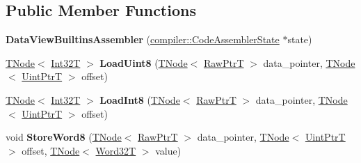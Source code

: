\subsection*{Public Member Functions}
\begin{DoxyCompactItemize}
\item 
\mbox{\label{classv8_1_1internal_1_1DataViewBuiltinsAssembler_a2ac89586bf597c858a300190d733b458}} 
{\bfseries Data\+View\+Builtins\+Assembler} (\mbox{\hyperlink{classv8_1_1internal_1_1compiler_1_1CodeAssemblerState}{compiler\+::\+Code\+Assembler\+State}} $\ast$state)
\item 
\mbox{\label{classv8_1_1internal_1_1DataViewBuiltinsAssembler_a9f5eb65a61b2cbe8985f022b7ca23966}} 
\mbox{\hyperlink{classv8_1_1internal_1_1compiler_1_1TNode}{T\+Node}}$<$ \mbox{\hyperlink{structv8_1_1internal_1_1Int32T}{Int32T}} $>$ {\bfseries Load\+Uint8} (\mbox{\hyperlink{classv8_1_1internal_1_1compiler_1_1TNode}{T\+Node}}$<$ \mbox{\hyperlink{structv8_1_1internal_1_1RawPtrT}{Raw\+PtrT}} $>$ data\+\_\+pointer, \mbox{\hyperlink{classv8_1_1internal_1_1compiler_1_1TNode}{T\+Node}}$<$ \mbox{\hyperlink{structv8_1_1internal_1_1UintPtrT}{Uint\+PtrT}} $>$ offset)
\item 
\mbox{\label{classv8_1_1internal_1_1DataViewBuiltinsAssembler_aa5d813eb0bf639de531bba19013b8c51}} 
\mbox{\hyperlink{classv8_1_1internal_1_1compiler_1_1TNode}{T\+Node}}$<$ \mbox{\hyperlink{structv8_1_1internal_1_1Int32T}{Int32T}} $>$ {\bfseries Load\+Int8} (\mbox{\hyperlink{classv8_1_1internal_1_1compiler_1_1TNode}{T\+Node}}$<$ \mbox{\hyperlink{structv8_1_1internal_1_1RawPtrT}{Raw\+PtrT}} $>$ data\+\_\+pointer, \mbox{\hyperlink{classv8_1_1internal_1_1compiler_1_1TNode}{T\+Node}}$<$ \mbox{\hyperlink{structv8_1_1internal_1_1UintPtrT}{Uint\+PtrT}} $>$ offset)
\item 
\mbox{\label{classv8_1_1internal_1_1DataViewBuiltinsAssembler_aaa49121464674eaa54b5bcdb797e6064}} 
void {\bfseries Store\+Word8} (\mbox{\hyperlink{classv8_1_1internal_1_1compiler_1_1TNode}{T\+Node}}$<$ \mbox{\hyperlink{structv8_1_1internal_1_1RawPtrT}{Raw\+PtrT}} $>$ data\+\_\+pointer, \mbox{\hyperlink{classv8_1_1internal_1_1compiler_1_1TNode}{T\+Node}}$<$ \mbox{\hyperlink{structv8_1_1internal_1_1UintPtrT}{Uint\+PtrT}} $>$ offset, \mbox{\hyperlink{classv8_1_1internal_1_1compiler_1_1TNode}{T\+Node}}$<$ \mbox{\hyperlink{structv8_1_1internal_1_1Word32T}{Word32T}} $>$ value)

\end{DoxyCompactItemize}

